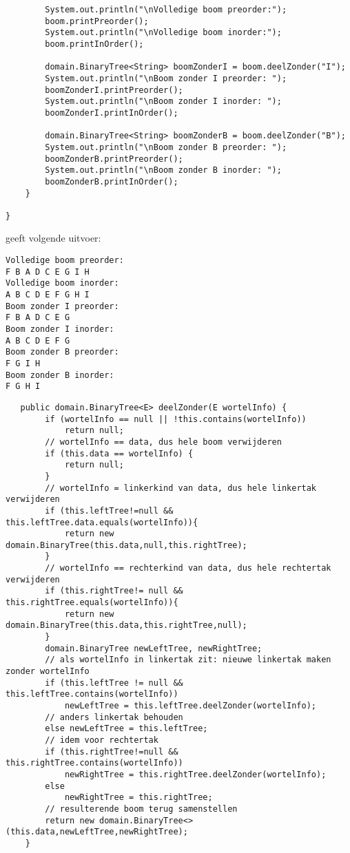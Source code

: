 \begin{oef}
\begin{lstlisting}
        System.out.println("\nVolledige boom preorder:");
        boom.printPreorder();
        System.out.println("\nVolledige boom inorder:");
        boom.printInOrder();

        domain.BinaryTree<String> boomZonderI = boom.deelZonder("I");
        System.out.println("\nBoom zonder I preorder: ");
        boomZonderI.printPreorder();
        System.out.println("\nBoom zonder I inorder: ");
        boomZonderI.printInOrder();

        domain.BinaryTree<String> boomZonderB = boom.deelZonder("B");
        System.out.println("\nBoom zonder B preorder: ");
        boomZonderB.printPreorder();
        System.out.println("\nBoom zonder B inorder: ");
        boomZonderB.printInOrder();
    }

}
\end{lstlisting}

geeft volgende uitvoer:
\begin{lstlisting}
Volledige boom preorder:
F B A D C E G I H 
Volledige boom inorder:
A B C D E F G H I 
Boom zonder I preorder: 
F B A D C E G 
Boom zonder I inorder: 
A B C D E F G 
Boom zonder B preorder: 
F G I H 
Boom zonder B inorder: 
F G H I 
\end{lstlisting}
\begin{opl}
\begin{lstlisting}
   public domain.BinaryTree<E> deelZonder(E wortelInfo) {
        if (wortelInfo == null || !this.contains(wortelInfo))
            return null;
        // wortelInfo == data, dus hele boom verwijderen
        if (this.data == wortelInfo) {
            return null;
        }
        // wortelInfo = linkerkind van data, dus hele linkertak verwijderen
        if (this.leftTree!=null && this.leftTree.data.equals(wortelInfo)){
            return new domain.BinaryTree(this.data,null,this.rightTree);
        }
        // wortelInfo == rechterkind van data, dus hele rechtertak verwijderen
        if (this.rightTree!= null && this.rightTree.equals(wortelInfo)){
            return new domain.BinaryTree(this.data,this.rightTree,null);
        }
        domain.BinaryTree newLeftTree, newRightTree;
        // als wortelInfo in linkertak zit: nieuwe linkertak maken zonder wortelInfo
        if (this.leftTree != null && this.leftTree.contains(wortelInfo))
            newLeftTree = this.leftTree.deelZonder(wortelInfo);
        // anders linkertak behouden
        else newLeftTree = this.leftTree;
        // idem voor rechtertak
        if (this.rightTree!=null && this.rightTree.contains(wortelInfo))
            newRightTree = this.rightTree.deelZonder(wortelInfo);
        else
            newRightTree = this.rightTree;
        // resulterende boom terug samenstellen
        return new domain.BinaryTree<>(this.data,newLeftTree,newRightTree);
    }
\end{lstlisting}
\end{opl}
\end{oef}




